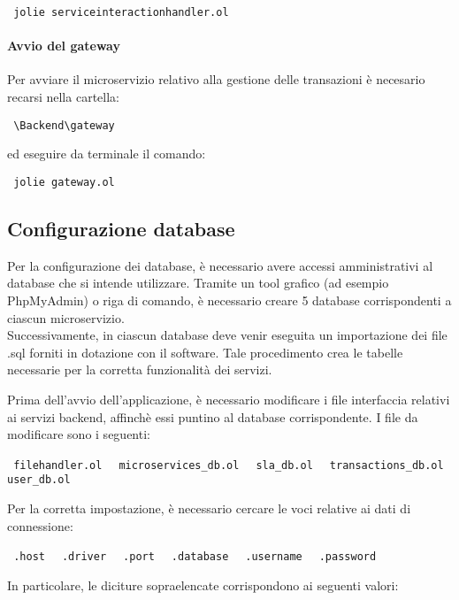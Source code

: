 	\begin{center}
		\verb| jolie serviceinteractionhandler.ol |
	\end{center}


\paragraph{Avvio del gateway}
	Per avviare il microservizio relativo alla gestione delle transazioni è necesario recarsi nella cartella:
	\begin{center}
		\verb| \Backend\gateway|
	\end{center}
	
	ed eseguire da terminale il comando:
	
	\begin{center}
		\verb| jolie gateway.ol |
	\end{center}

\newpage
\subsection{Configurazione database}

Per la configurazione dei database, è necessario avere accessi amministrativi al database che si intende utilizzare. Tramite un tool grafico (ad esempio PhpMyAdmin) o riga di comando, è necessario creare 5 database corrispondenti a ciascun microservizio. \\ Successivamente, in ciascun database deve venir eseguita un importazione dei file .sql forniti in dotazione con il software. Tale procedimento crea le tabelle necessarie per la corretta funzionalità dei servizi.

Prima dell'avvio dell'applicazione, è necessario modificare i file interfaccia relativi ai servizi backend, affinchè essi puntino al database corrispondente. I file da modificare sono i seguenti:
\begin{center}
	\verb| filehandler.ol |
	\verb| microservices_db.ol |
	\verb| sla_db.ol |
	\verb| transactions_db.ol |
	\verb| user_db.ol |
\end{center}

Per la corretta impostazione, è necessario cercare le voci relative ai dati di connessione:

\begin{center}
	\verb| .host |
	\verb| .driver |
	\verb| .port |
	\verb| .database |
	\verb| .username |
	\verb| .password |
\end{center}

In particolare, le diciture sopraelencate corrispondono ai seguenti valori:

